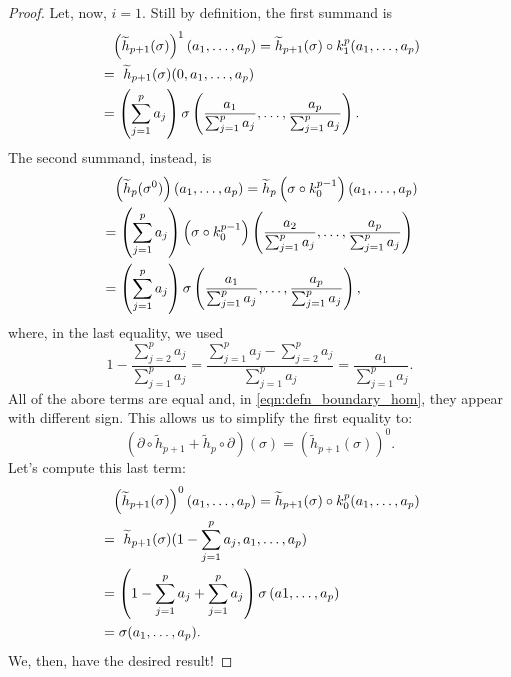 \begin{proof}
	Let, now, $i = 1$.
	Still by definition, the first summand is
	\begin{align}
		&\hphantom{=} \left( \widetilde{h}_{p+1}(\sigma) \right)^1 (a_1, \ldots, a_p) = \widetilde{h}_{p+1}(\sigma) \circ k_1^p (a_1, \ldots, a_p)\\ 
		&=\ \widetilde{h}_{p+1}(\sigma)(0, a_1, \ldots, a_p)\\
		&= \left( \sum_{j=1}^{p} a_j \right) \sigma\left(\frac{a_1}{\sum_{j=1}^{p} a_j}, \ldots, \frac{a_p}{\sum_{j=1}^{p} a_j} \right)
	.\end{align} 
	The second summand, instead, is
	\begin{align}
		&\hphantom{=} \left( \widetilde{h}_{p}(\sigma^{0}) \right) (a_1, \ldots, a_p) = \widetilde{h}_{p}\left(\sigma \circ k_{0}^{p-1}\right) (a_1, \ldots, a_p)\\
		&= \left( \sum_{j=1}^{p} a_j \right) \left(\sigma \circ k_{0}^{p-1}\right) \left(\frac{a_2}{\sum_{j=1}^{p} a_j}, \ldots, \frac{a_p}{\sum_{j=1}^{p} a_j} \right)\\
		&= \left( \sum_{j=1}^{p} a_j \right) \sigma\left(\frac{a_1}{\sum_{j=1}^{p} a_j}, \ldots, \frac{a_p}{\sum_{j=1}^{p} a_j} \right)
	,\end{align} 
	where, in the last equality, we used
	\begin{equation}
	1 - \frac{\sum_{j=2}^{p} a_j}{\sum_{j=1}^{p} a_j} = \frac{\sum_{j=1}^{p} a_j - \sum_{j=2}^{p} a_j}{\sum_{j=1}^{p} a_j} = \frac{a_1}{\sum_{j=1}^{p} a_j}
	.\end{equation} 
	All of the abore terms are equal and, in \eqref{eqn:defn_boundary_hom}, they appear with different sign.
	This allows us to simplify the first equality to:
	\begin{equation}
		\left(\partial \circ \widetilde{h}_{p+1} + \widetilde{h}_p \circ \partial\right)(\sigma) = \left( \widetilde{h}_{p+1}(\sigma) \right)^0
	.\end{equation} 
	Let's compute this last term:
	\begin{align}
		&\hphantom{=} \left( \widetilde{h}_{p+1} (\sigma) \right)^0 (a_1, \ldots, a_p) = \widetilde{h}_{p+1}(\sigma) \circ k_0^p (a_1, \ldots, a_p)\\
		&=\ \widetilde{h}_{p+1}(\sigma) (1 - \sum_{j=1}^{p} a_j, a_1, \ldots, a_p)\\
		&= \left( 1 - \sum_{j=1}^{p} a_j + \sum_{j=1}^{p} a_j \right) \sigma \left( a1, \ldots, a_p \right)\\
		&= \sigma (a_1, \ldots, a_p)
	.\end{align}
	We, then, have the desired result!
\end{proof}

